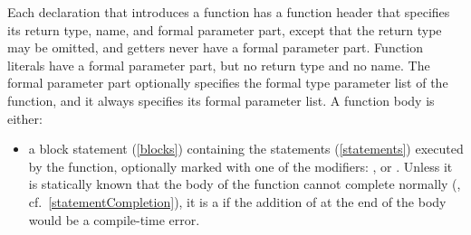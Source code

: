 \documentclass[makeidx]{article}
\begin{document}
\LMHash{}%
Each declaration that introduces a function has
a function header that specifies
its return type, name, and formal parameter part,
except that the return type may be omitted,
and getters never have a formal parameter part.
Function literals have a formal parameter part, but no return type and no name.
The formal parameter part optionally specifies
the formal type parameter list of the function,
and it always specifies its formal parameter list.
A function body is either:
\begin{itemize}
\item
  a block statement (\ref{blocks}) containing
  the statements (\ref{statements}) executed by the function,
  optionally marked with one of the modifiers:
  \ASYNC, \code{\ASYNC*} or \code{\SYNC*}.
  Unless it is statically known that the body of the function
  cannot complete normally
  (,
  cf.~\ref{statementCompletion}),
  it is a  if
  the addition of \code{\RETURN;} at the end of the body
  would be a compile-time error.



\end{itemize}
\end{document}
